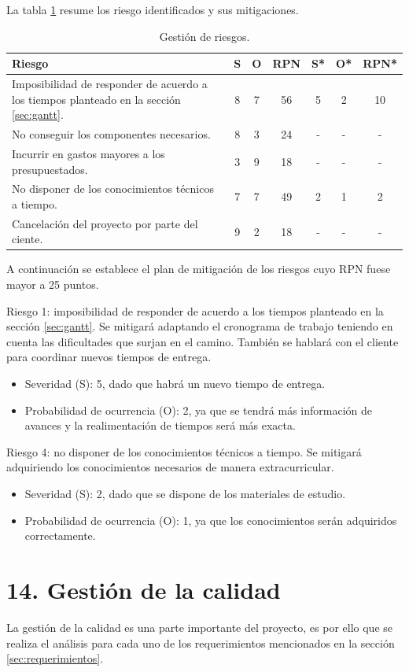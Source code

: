 \documentclass[
11pt, %
]{charter}
\begin{document}
La tabla \ref{tab:riesgos} resume los riesgo identificados y sus mitigaciones.
\begin{table}[htpb]
\centering
\begin{tabularx}{\linewidth}{@{}|X|c|c|c|c|c|c|@{}}
\hline
\rowcolor[HTML]{C0C0C0} 
Riesgo & S & O & RPN & S* & O* & RPN* \\ \hline
Imposibilidad de responder de acuerdo a los tiempos planteado en la sección \ref{sec:gantt}.&8&7&56&5&2&10\\ \hline
No conseguir los componentes necesarios.&8&3&24&-&-&-\\ \hline
Incurrir en gastos mayores a los presupuestados.&3&9&18&-&-&-\\ \hline
No disponer de los conocimientos técnicos a tiempo.&7&7&49&2&1&2\\ \hline
Cancelación del proyecto por parte del ciente.&9&2&18&-&-&-\\ \hline
\end{tabularx}%
\caption{Gestión de riesgos.}
\label{tab:riesgos}
\end{table}

A continuación se establece el plan de mitigación de los riesgos cuyo RPN fuese mayor a 25 puntos.

Riesgo 1: imposibilidad de responder de acuerdo a los tiempos planteado en la sección \ref{sec:gantt}. Se mitigará adaptando el cronograma de trabajo teniendo en cuenta las dificultades que surjan en el camino. También se hablará con el cliente para coordinar nuevos tiempos de entrega.
\begin{itemize}
	\item Severidad (S): 5, dado que habrá un nuevo tiempo de entrega.
	\item Probabilidad de ocurrencia (O): 2, ya que se tendrá más información de avances y la realimentación de tiempos será más exacta. 
\end{itemize}

Riesgo 4: no disponer de los conocimientos técnicos a tiempo. Se mitigará adquiriendo los conocimientos necesarios de manera extracurricular.
\begin{itemize}
	\item Severidad (S): 2, dado que se dispone de los materiales de estudio.
	\item Probabilidad de ocurrencia (O): 1, ya que los conocimientos serán adquiridos correctamente. 
\end{itemize}


\section{14. Gestión de la calidad}
\label{sec:calidad}
La gestión de la calidad es una parte importante del proyecto, es por ello que se realiza el análisis para cada uno de los requerimientos mencionados en la sección \ref{sec:requerimientos}.
\end{document}
